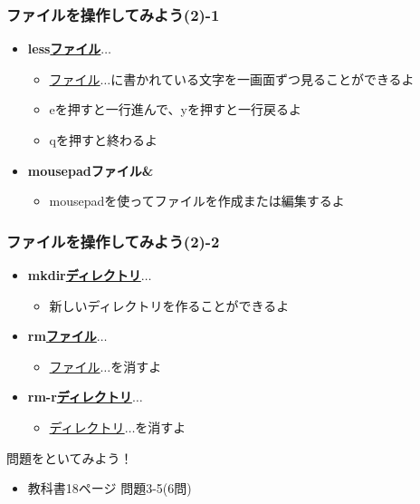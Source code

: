 \begin{frame}
    \frametitle{ファイルを操作してみよう(2)-1}
    \begin{itemize}
        \item {\bf less\textvisiblespace\underline{ファイル}$\ldots$}
        \begin{itemize}
            \small
            \item[] \underline{ファイル}$\ldots$に書かれている文字を一画面ずつ見ることができるよ
            \item[] eを押すと一行進んで、yを押すと一行戻るよ
            \item[] qを押すと終わるよ
        \end{itemize}
        \item {\bf mousepad\textvisiblespace ファイル\textvisiblespace\&}
        \begin{itemize}
            \small
            \item[] mousepadを使ってファイルを作成または編集するよ
        \end{itemize}
    \end{itemize}
\end{frame}

\begin{frame}
    \frametitle{ファイルを操作してみよう(2)-2}
    \begin{itemize}
        \item {\bf mkdir\textvisiblespace\underline{ディレクトリ}$\ldots$}
        \begin{itemize}
            \small
            \item[] 新しいディレクトリを作ることができるよ
        \end{itemize}
        \item {\bf rm\textvisiblespace\underline{ファイル}$\ldots$}
        \begin{itemize}
            \small
            \item[] \underline{ファイル}$\ldots$を消すよ
        \end{itemize}
        \item {\bf rm\textvisiblespace -r\textvisiblespace\underline{ディレクトリ}$\ldots$}
        \begin{itemize}
            \small
            \item[] \underline{ディレクトリ}$\ldots$を消すよ
        \end{itemize}
    \end{itemize}
    \begin{figure}[h]
        \centering
        
    \end{figure}
\end{frame}

\begin{frame}
    \begin{exampleblock}{問題をといてみよう！}
        \begin{itemize}
            \item 教科書18ページ 問題3-5(6問)
            \end{itemize}
    \end{exampleblock} 
\end{frame}